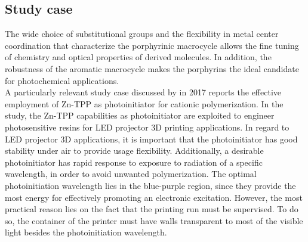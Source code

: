 \documentclass[num-refs]{wiley-article}
\begin{document}
\subsection{Study case}
The wide choice of substitutional groups and the flexibility in metal center coordination that characterize the porphyrinic macrocycle allows the fine tuning of chemistry and optical properties of derived molecules.
In addition, the robustness of the aromatic macrocycle makes the porphyrins the ideal candidate for photochemical applications.\\
A particularly relevant study case discussed by \citet{al_mousawi_zinc_2017} in 2017 reports the effective employment of Zn-TPP as photoinitiator for cationic polymerization.
In the study, the Zn-TPP capabilities as photoinitiator are exploited to engineer photosensitive resins for LED projector 3D printing applications.
In regard to LED projector 3D applications, it is important that the photoinitiator has good stability under air to provide usage flexibility.
Additionally, a desirable photoinitiator has rapid response to exposure to radiation of a specific wavelength, in order to avoid unwanted polymerization.
The optimal photoinitiation wavelength lies in the blue-purple region, since they provide the most energy for effectively promoting an electronic excitation.
However, the most practical reason lies on the fact that the printing run must be supervised.
To do so, the container of the printer must have walls transparent to most of the visible light besides the photoinitiation wavelength.\\
\end{document}
